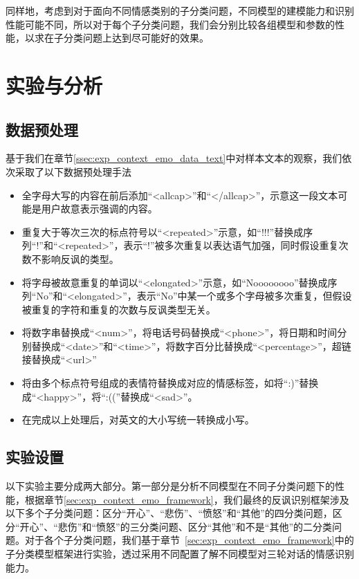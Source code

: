 同样地，考虑到对于面向不同情感类别的子分类问题，不同模型的建模能力和识别性能可能不同，所以对于每个子分类问题，我们会分别比较各组模型和参数的性能，以求在子分类问题上达到尽可能好的效果。

\section{实验与分析}
\label{sec:exp_context_emo_exp}

\subsection{数据预处理}

基于我们在章节\ref{ssec:exp_context_emo_data_text}中对样本文本的观察，我们依次采取了以下数据预处理手法

\begin{itemize}

\item 全字母大写的内容在前后添加“<allcap>”和“</allcap>”，示意这一段文本可能是用户故意表示强调的内容。

\item 重复大于等次三次的标点符号以“<repeated>”示意，如“!!!”替换成序列“!”和“<repeated>”，表示“!”被多次重复以表达语气加强，同时假设重复次数不影响反讽的类型。

\item 将字母被故意重复的单词以“<elongated>”示意，如“Noooooooo”替换成序列“No”和“<elongated>”，表示“No”中某一个或多个字母被多次重复，但假设被重复的字符和重复的次数与反讽类型无关。

\item 将数字串替换成“<num>”，将电话号码替换成“<phone>”，将日期和时间分别替换成“<date>”和“<time>”，将数字百分比替换成“<percentage>”，超链接替换成“<url>”

\item 将由多个标点符号组成的表情符替换成对应的情感标签，如将“:)”替换成“<happy>”，将“:((”替换成“<sad>”。

\item 在完成以上处理后，对英文的大小写统一转换成小写。

\end{itemize}

\subsection{实验设置}

以下实验主要分成两大部分。第一部分是分析不同模型在不同子分类问题下的性能，根据章节\ref{sec:exp_context_emo_framework}，我们最终的反讽识别框架涉及以下多个子分类问题：区分“开心”、“悲伤”、“愤怒”和“其他”的四分类问题，区分“开心”、“悲伤”和“愤怒”的三分类问题、区分“其他”和不是“其他”的二分类问题。对于各个子分类问题，我们基于章节~\ref{sec:exp_context_emo_framework}中的子分类模型框架进行实验，透过采用不同配置了解不同模型对三轮对话的情感识别能力。

